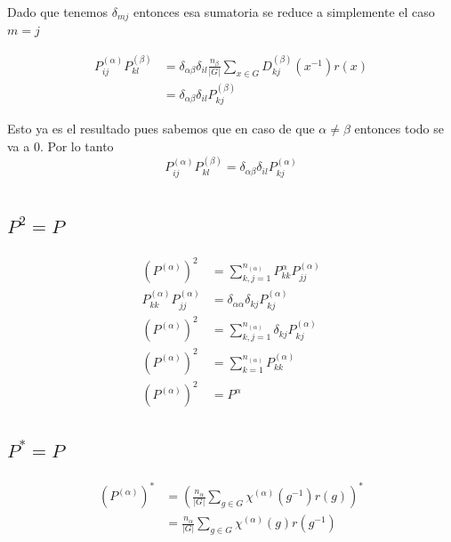 \documentclass[12pt]{amsart}
\begin{document}
  Dado que tenemos $\delta_{mj}$ entonces esa sumatoria se reduce a simplemente el caso $m = j$

  \begin{align*}
    P_{ij}^{(\alpha)} P_{kl}^{(\beta)}&= \delta_{\alpha\beta} \delta_{il}\frac{n_\beta}{\left|G\right|} \sum_{x \in G} D_{kj}^{(\beta)}(x^{-1}) r(x) \\
    &= \delta_{\alpha\beta} \delta_{il}P_{kj}^{(\beta)}
  \end{align*}

  Esto ya es el resultado pues sabemos que en caso de que $\alpha \neq \beta$ entonces todo se va a $0$. Por lo tanto
  $$P_{ij}^{(\alpha)} P_{kl}^{(\beta)} = \delta_{\alpha\beta} \delta_{il} P_{kj}^{(\alpha)}$$
  \newpage

  \section{}

  \subsection{$P^2 = P$}

  \begin{align*}
    \left(P^{(\alpha)}\right)^2 &= \sum_{k, j = 1}^{n_{(\alpha)}} P_{kk}^\alpha P_{jj}^{(\alpha)}\\
    P_{kk}^{(\alpha)} P_{jj}^{(\alpha)} &= \delta_{\alpha\alpha} \delta_{kj} P_{kj}^{(\alpha)}\\
    \left(P^{(\alpha)}\right)^2 &= \sum_{k, j = 1}^{n_{(\alpha)}} \delta_{kj} P_{kj}^{(\alpha)}\\
    \left(P^{(\alpha)}\right)^2 &= \sum_{k = 1}^{n_{(\alpha)}} P_{kk}^{(\alpha)}\\
    \left(P^{(\alpha)}\right)^2 &= P^\alpha
  \end{align*}

  \subsection{$P^* = P$}

  \begin{align*}
    \left(P^{(\alpha)}\right)^* &= \left(\frac{n_\alpha}{\left| G \right|} \sum_{g \in G} \chi^{(\alpha)}(g^{-1})r(g)\right)^*\\
    &= \frac{n_\alpha}{\left| G \right|} \sum_{g \in G} \chi^{(\alpha)}(g)r(g^{-1})\\
  \end{align*}
\end{document}
